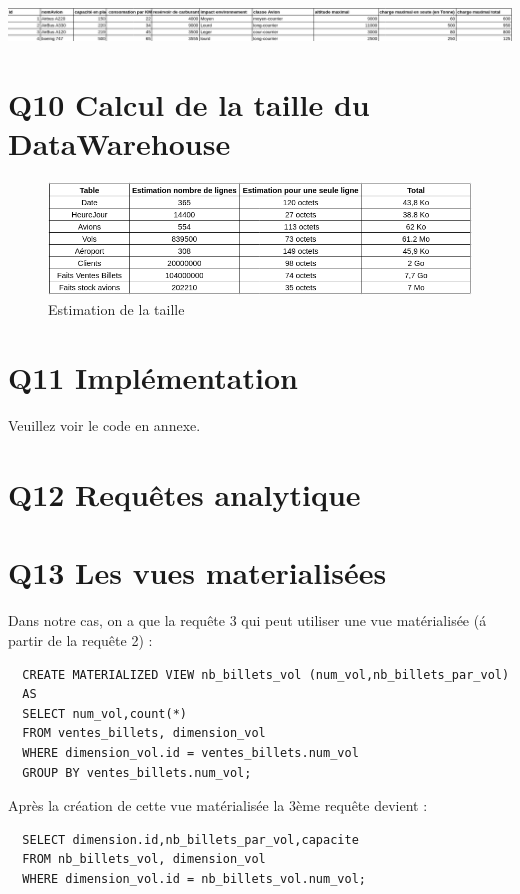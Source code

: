 \documentclass[oneside,13pt,a4paper]{article}
\begin{document}
  
  \includegraphics[width=1\textwidth]{img/avion.png}
  

\section{Q10 Calcul de la taille du DataWarehouse}

\begin{figure}[h]
  \centering
  \includegraphics[width=1\textwidth]{img/estimation_taille.png}
  \caption{Estimation de la taille}
\end{figure}

\section{Q11 Implémentation}

Veuillez voir le code en annexe.

\section{Q12 Requêtes analytique}



\section{Q13 Les vues materialisées} 

Dans notre cas, on a que la requête 3 qui peut utiliser une vue matérialisée (\'a partir de la requête 2) : 

\begin{lstlisting}
  CREATE MATERIALIZED VIEW nb_billets_vol (num_vol,nb_billets_par_vol)
  AS 
  SELECT num_vol,count(*)
  FROM ventes_billets, dimension_vol
  WHERE dimension_vol.id = ventes_billets.num_vol
  GROUP BY ventes_billets.num_vol;
\end{lstlisting}

Après la création de cette vue matérialisée la 3ème requête devient : 

\begin{lstlisting}
  SELECT dimension.id,nb_billets_par_vol,capacite
  FROM nb_billets_vol, dimension_vol
  WHERE dimension_vol.id = nb_billets_vol.num_vol;
\end{lstlisting}
\end{document}
